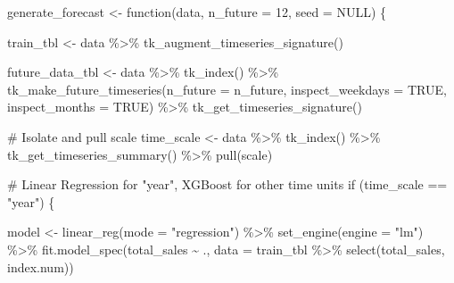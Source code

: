 \documentclass[
  11pt,
]{article}
\newenvironment{Shaded}{\begin{snugshade}}{\end{snugshade}}
\newcommand{\AttributeTok}[1]{\textcolor[rgb]{0.40,0.45,0.13}{#1}}
\newcommand{\CommentTok}[1]{\textcolor[rgb]{0.37,0.37,0.37}{#1}}
\newcommand{\ConstantTok}[1]{\textcolor[rgb]{0.56,0.35,0.01}{#1}}
\newcommand{\ControlFlowTok}[1]{\textcolor[rgb]{0.00,0.23,0.31}{#1}}
\newcommand{\DecValTok}[1]{\textcolor[rgb]{0.68,0.00,0.00}{#1}}
\newcommand{\FunctionTok}[1]{\textcolor[rgb]{0.28,0.35,0.67}{#1}}
\newcommand{\NormalTok}[1]{\textcolor[rgb]{0.00,0.23,0.31}{#1}}
\newcommand{\OtherTok}[1]{\textcolor[rgb]{0.00,0.23,0.31}{#1}}
\newcommand{\SpecialCharTok}[1]{\textcolor[rgb]{0.37,0.37,0.37}{#1}}
\newcommand{\StringTok}[1]{\textcolor[rgb]{0.13,0.47,0.30}{#1}}
\begin{document}
\begin{Shaded}
\begin{Highlighting}[]
\NormalTok{generate\_forecast }\OtherTok{\textless{}{-}}
\ControlFlowTok{function}\NormalTok{(data, }\AttributeTok{n\_future =} \DecValTok{12}\NormalTok{, }\AttributeTok{seed =} \ConstantTok{NULL}\NormalTok{) \{}

\NormalTok{  train\_tbl }\OtherTok{\textless{}{-}}\NormalTok{ data }\SpecialCharTok{\%\textgreater{}\%}
    \FunctionTok{tk\_augment\_timeseries\_signature}\NormalTok{()}

\NormalTok{  future\_data\_tbl }\OtherTok{\textless{}{-}}\NormalTok{ data }\SpecialCharTok{\%\textgreater{}\%}
    \FunctionTok{tk\_index}\NormalTok{() }\SpecialCharTok{\%\textgreater{}\%}
    \FunctionTok{tk\_make\_future\_timeseries}\NormalTok{(}\AttributeTok{n\_future =}\NormalTok{ n\_future,}
                              \AttributeTok{inspect\_weekdays =} \ConstantTok{TRUE}\NormalTok{,}
                              \AttributeTok{inspect\_months =} \ConstantTok{TRUE}\NormalTok{) }\SpecialCharTok{\%\textgreater{}\%}
    \FunctionTok{tk\_get\_timeseries\_signature}\NormalTok{()}

  \CommentTok{\# Isolate and pull scale}
\NormalTok{  time\_scale }\OtherTok{\textless{}{-}}\NormalTok{  data }\SpecialCharTok{\%\textgreater{}\%}
    \FunctionTok{tk\_index}\NormalTok{() }\SpecialCharTok{\%\textgreater{}\%}
    \FunctionTok{tk\_get\_timeseries\_summary}\NormalTok{() }\SpecialCharTok{\%\textgreater{}\%}
    \FunctionTok{pull}\NormalTok{(scale)}

  \CommentTok{\# Linear Regression for "year", XGBoost for other time units}
  \ControlFlowTok{if}\NormalTok{ (time\_scale }\SpecialCharTok{==} \StringTok{"year"}\NormalTok{) \{}

\NormalTok{    model }\OtherTok{\textless{}{-}} \FunctionTok{linear\_reg}\NormalTok{(}\AttributeTok{mode =} \StringTok{"regression"}\NormalTok{) }\SpecialCharTok{\%\textgreater{}\%}
      \FunctionTok{set\_engine}\NormalTok{(}\AttributeTok{engine =} \StringTok{"lm"}\NormalTok{) }\SpecialCharTok{\%\textgreater{}\%}
      \FunctionTok{fit.model\_spec}\NormalTok{(total\_sales }\SpecialCharTok{\textasciitilde{}}\NormalTok{ .,}
                     \AttributeTok{data =}\NormalTok{ train\_tbl }\SpecialCharTok{\%\textgreater{}\%} \FunctionTok{select}\NormalTok{(total\_sales, index.num))}


\end{Highlighting}
\end{Shaded}
\end{document}
